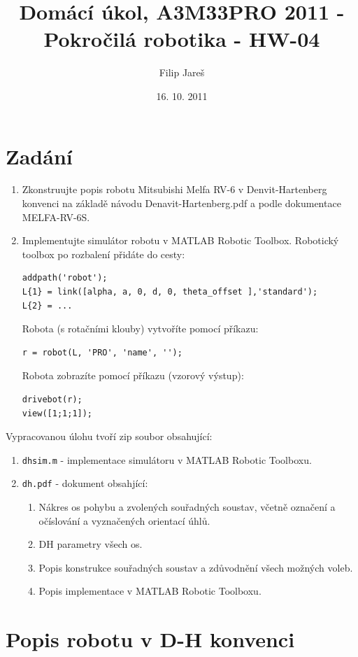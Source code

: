 \documentclass[11pt,oneside,a4paper,pdftex]{article}   %
\title{Domácí úkol, A3M33PRO 2011 - Pokročilá robotika - HW-04}
\date{16. 10. 2011}
\author{Filip Jareš}
\begin{document}
\maketitle

\section{Zadání}

\begin{enumerate}
\item Zkonstruujte popis robotu Mitsubishi Melfa RV-6 v Denvit-Hartenberg konvenci na
základě návodu Denavit-Hartenberg.pdf a podle dokumentace MELFA-RV-6S.
\item Implementujte simulátor robotu v MATLAB Robotic Toolbox.
Robotický toolbox po rozbalení přidáte do cesty:
\begin{lstlisting}
addpath('robot');
L{1} = link([alpha, a, 0, d, 0, theta_offset ],'standard');
L{2} = ...
\end{lstlisting}
Robota (s rotačními klouby) vytvoříte pomocí příkazu:
\begin{lstlisting}
r = robot(L, 'PRO', 'name', '');
\end{lstlisting}
Robota zobrazíte pomocí příkazu (vzorový výstup):
\begin{lstlisting}
drivebot(r);
view([1;1;1]);
\end{lstlisting}
\end{enumerate}

\noindent Vypracovanou úlohu tvoří zip soubor obsahující:

\begin{enumerate}
   \item \lstinline{dhsim.m} - implementace simulátoru v MATLAB Robotic Toolboxu.
   \item \lstinline{dh.pdf} - dokument obsahjící:
		\begin{enumerate}
				\item Nákres os pohybu a zvolených souřadných soustav, včetně označení a očíslování a vyznačených orientací úhlů.
				\item DH parametry všech os.
				\item Popis konstrukce souřadných soustav a zdůvodnění všech možných voleb.
				\item Popis implementace v MATLAB Robotic Toolboxu.
		\end{enumerate}
\end{enumerate}

\newpage
\section{Popis robotu v D-H konvenci}
\end{document}
